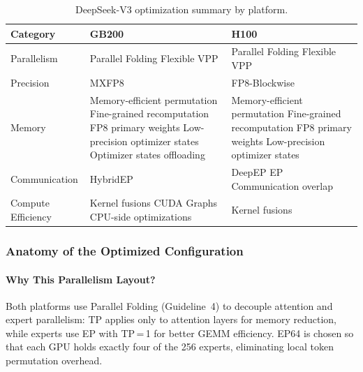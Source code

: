 \documentclass[10pt,logo,copyright]{nvidiatechreport}
\begin{document}
\begin{table}[ht]
\centering
\caption{DeepSeek-V3 optimization summary by platform.}
\label{tab:deepseekv3-journey}
\begin{tabular}{lp{5cm}p{5cm}}
\toprule
\textbf{Category} & \textbf{GB200} & \textbf{H100} \\
\midrule
Parallelism & Parallel Folding \newline Flexible VPP & Parallel Folding \newline Flexible VPP \\
\midrule
Precision & MXFP8 & FP8-Blockwise \\
\midrule
Memory & Memory-efficient permutation \newline Fine-grained recomputation \newline FP8 primary weights \newline Low-precision optimizer states \newline Optimizer states offloading & Memory-efficient permutation \newline Fine-grained recomputation \newline FP8 primary weights \newline Low-precision optimizer states \\
\midrule
Communication & HybridEP & DeepEP \newline EP Communication overlap \\
\midrule
Compute Efficiency & Kernel fusions \newline CUDA Graphs \newline CPU-side optimizations & Kernel fusions \\
\bottomrule
\end{tabular}
\end{table}

\subsubsection{Anatomy of the Optimized Configuration}

\paragraph*{Why This Parallelism Layout?}
Both platforms use Parallel Folding (Guideline~4) to decouple attention and expert parallelism: TP applies only to attention layers for memory reduction, while experts use EP with TP\,=\,1 for better GEMM efficiency. EP64 is chosen so that each GPU holds exactly four of the 256 experts, eliminating local token permutation overhead.
\end{document}
